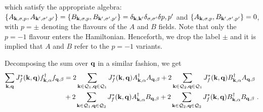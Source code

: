 \documentclass[%
reprint,
superscriptaddress,
groupedaddress,
superscriptaddress,
onecolumn,
]{revtex4-2}
\begin{document}
which satisfy the appropriate algebra: \(\left\{A_{{\bf k},\sigma, p}, A_{{\bf k}^\prime,\sigma^\prime, p^\prime}\right\} = \left\{B_{{\bf k},\sigma, p}, B_{{\bf k}^\prime,\sigma^\prime, p^\prime}\right\} = \delta_{{\bf k},{\bf k}^\prime}\delta_{\sigma,\sigma^\prime}\delta{p, p^\prime}\) and \(\left\{A_{{\bf k},\sigma,p}, B_{{\bf k}^\prime,\sigma^\prime,p^\prime}\right\} = 0\), with \(p=\pm\) denoting the flavours of the \(A\) and \(B\) fields. Note that only the \(p=-1\) flavour enters the Hamiltonian. Henceforth, we drop the label \(\pm\) and it is implied that \(A\) and \(B\) refer to the \(p=-1\) variants.

Decomposing the sum over \({\bf q}\) in a similar fashion, we get
\begin{equation}\begin{aligned}
	\sum_{{\bf k}, {\bf q}} J_f^*({\bf k},{\bf q}) f^\dagger_{{\bf k},\alpha}f_{{\bf q},\beta} 
	&= 2\sum_{{\bf k} \in \mathcal{Q}_1, {\bf q} \in \mathcal{Q}_1} J_f^*({\bf k},{\bf q}) A^\dagger_{{\bf k},\alpha}A_{{\bf q},\beta} + 2\sum_{{\bf k} \in \mathcal{Q}_2, {\bf q} \in \mathcal{Q}_1} J_f^*({\bf k},{\bf q}) B^\dagger_{{\bf k},\alpha}A_{{\bf q},\beta} \\
	&+ 2\sum_{{\bf k} \in \mathcal{Q}_1, {\bf q} \in \mathcal{Q}_2} J_f^*({\bf k},{\bf q}) A^\dagger_{{\bf k},\alpha}B_{{\bf q},\beta} + 2\sum_{{\bf k} \in \mathcal{Q}_2, {\bf q} \in \mathcal{Q}_2} J_f^*({\bf k},{\bf q}) B^\dagger_{{\bf k},\alpha}B_{{\bf q},\beta}~.
\end{aligned}\end{equation}
\end{document}
